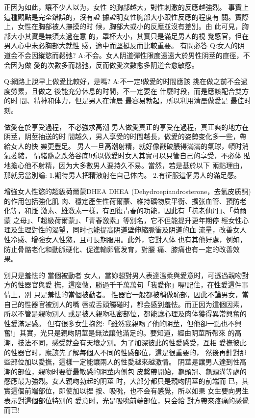 \documentclass[12pt,UTF8]{ctexbook}
\begin{document}
正因为如此，讓不少人以为，女性
的胸部越大，對性刺激的反應越強烈。
事實上這種觀點是完全錯誤的，沒有證
據證明女性胸部大小跟性反應的程度有
關。實際上，女性在胸部被人撫摸的时
候，胸部大或小的反應並沒有差別。由
此可見，胸部大小其實是無須太過在意
的，罩杯大小，其實只是滿足男人的視
覺感官，但在男人心中未必胸部大就性
感，適中而堅挺反而比較重要。
有問必答
Q:女人的阴道会不会因縱慾而鬆弛?
A:不会。女人阴道彈性限度遠遠大於男性阴莖的直徑，不会因为做
愛的次數多而鬆弛，反而做愛次數愈多阴道会愈敏感。

Q:網路上說早上做愛比較好，是嗎?
A:不一定!做愛的时間應該
挑在做之前不会過度勞累，且做之
後能充分休息的时間，不一定要在
什麼时段，而是應該配合雙方的时
間、精神和体力，但是男人在清晨
最容易勃起，所以利用清晨做愛是
最佳时刻。

做愛在於享受過程，
不必強求高潮
男人做愛真正的享受在過程，真正爽的地方在阴莖，阴莖抽送的时
間越久，男人享受的时間越長，做愛的姿勢变化多一些，帶給女人的快
樂更豐足。
男人一旦高潮射精，就好像戳破脹得滿滿的氣球，頓时消氣萎縮，
情緒隨之跌落谷底!所以做愛时女人其實可以只管自己的享受，不必体
貼地擔心他不射精，因为大多數男人要持久不易。當然，若是基於以下
兩點理由，那就另當別論:
1.期待男人把精液射在自己体内。
2.有征服這個男人的滿足感。

增強女人性慾的超級荷爾蒙DHEA
DHEA (Dehydroepiandrosterone，去氫皮质酮)的作用包括強化肌
肉、穩定產生性荷爾蒙、維持礦物质平衡、擴张血管、預防老化等，和雌
激素、雄激素一樣，有回復青春的功能，因此有「抗老仙丹」、「荷爾蒙
之母」、「超級荷爾蒙」、「青春激素」等別名，它不但能提升更年期停
經女性心理及生理對性的渴望，同时也能提高阴道壁伸縮脈衝及阴道的血
流量，改善女人性冷感、增強女人性慾，且可長期服用。此外，它對人体
也有其他好處，例如，防止骨骼老化和動脈硬化、促進輸卵管发育，對腰
痛、膝痛也有一定的改善效果。

別只是羞怯的
當個被動者
女人，當妳想對男人表達溫柔與愛意时，可透過親吻對方的性器官與愛
撫，這麼做，勝過千千萬萬句「我愛你」喔!記住，在性愛這件事情上，別
只是羞怯的當個被動者。
性器官一般都被稱做恥部，因此不論男女，當自己的性器官被別人的嘴
唇或舌頭觸碰时，都会感到羞怯。而正因为這個因素，所以不管是親吻別人
或是被人親吻私密部位，都能讓心理及肉体獲得異常興奮的性愛滿足感。
但有很多女生抱怨:「雖然我親吻了他的阴莖，但他卻一點也不興
奮!」其實，光只是親吻阴莖是無法讓他滿足的。要知道，經由阴莖所帶來
的高潮，技法不同，感受就会有天壤之別。为了加深彼此的性愛感受，互相
愛撫彼此的性器官时，應該先了解每個人不同的性感部位，這是很重要的，
然後再針對那些部位加以愛撫，這樣一定能讓兩人的性愛越來越激情。
阴莖是讓男人達到性高潮的部位，親吻时要從最敏感的阴莖内側包
皮繫帶開始，龜頭冠、龜頭溝等處的
感應最为強烈。女人親吻勃起的阴莖
时，大部分都只是親吻阴莖的前端而
已，其實這個前端部位，即使加以捏
按、吸吮，也不会有感覺，所以如果
女生要向男生表示對這個部位特別的
愛意时，光是吸吮前端部位，只会給
對方帶來疼痛的感覺而已!
\end{document}
